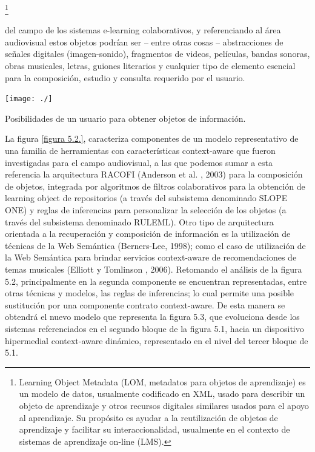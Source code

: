 \footnote{Learning Object Metadata (LOM, metadatos para objetos de aprendizaje) es un modelo de datos,
usualmente codificado en XML, usado para describir un objeto de aprendizaje y otros recursos digitales
similares usados para el apoyo al aprendizaje. Su propósito es ayudar a la reutilización de objetos de
aprendizaje y facilitar su interaccionalidad, usualmente en el contexto de sistemas de aprendizaje on-line
(LMS).} 


del campo de los sistemas e-learning colaborativos, y referenciando
al área audiovisual estos objetos podrían ser – entre otras cosas – abstracciones de
señales digitales (imagen-sonido), fragmentos de videos, películas, bandas sonoras,
obras musicales, letras, guiones literarios y cualquier tipo de elemento esencial para la
composición, estudio y consulta requerido por el usuario.

\begin{center}
 \texttt{[image: ./]}
\end{center}

\caption{Posibilidades de un usuario para obtener objetos de información.}
\label {figura 5.2.}


La figura \ref{figura 5.2.}, caracteriza componentes de un modelo representativo
de una familia de herramientas con características context-aware que fueron
investigadas para el campo audiovisual, a las que podemos sumar a esta
referencia la arquitectura RACOFI (Anderson et al. , 2003) para la composición
de objetos, integrada por algoritmos de filtros colaborativos para la obtención
de learning object de repositorios (a través del
subsistema denominado SLOPE ONE) y reglas de inferencias para personalizar la
selección de los objetos (a través del subsistema denominado RULEML). Otro tipo de
arquitectura orientada a la recuperación y composición de información es la utilización
de técnicas de la Web Semántica (Berners-Lee, 1998); como el caso de utilización de la
Web Semántica para brindar servicios context-aware de recomendaciones de temas
musicales (Elliott y Tomlinson , 2006).
Retomando el análisis de la figura 5.2, principalmente en la segunda componente se
encuentran representadas, entre otras técnicas y modelos, las reglas de inferencias; lo
cual permite una posible sustitución por una componente contrato context-aware.
De esta manera se obtendrá el nuevo modelo que representa la figura 5.3, que
evoluciona desde los sistemas referenciados en el segundo bloque de la figura 5.1, hacia
un dispositivo hipermedial context-aware dinámico, representado en el nivel del tercer
bloque de 5.1.

